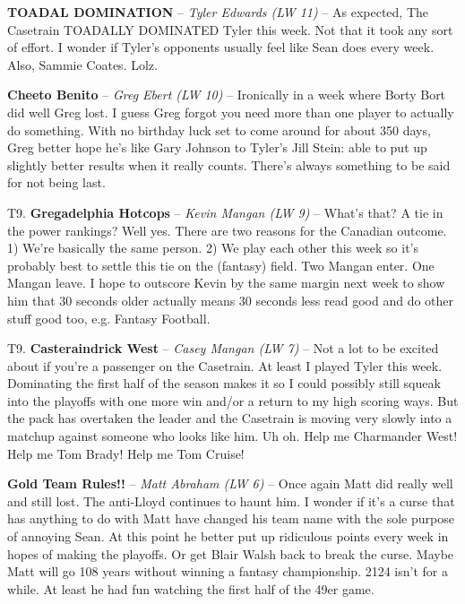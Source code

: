 \documentclass[11pt,letterpaper]{article}
\begin{document}
\newpage
{}
\begin{etaremune}
\setcounter{enumi}{13}
\item \textbf{TOADAL DOMINATION} -- \textit{Tyler Edwards (LW 11)} -- As expected, The Casetrain TOADALLY DOMINATED Tyler this week. Not that it took any sort of effort. I wonder if Tyler's opponents usually feel like Sean does every week. Also, Sammie Coates. Lolz. 
\item \textbf{Cheeto Benito} -- \textit{Greg Ebert (LW 10)} -- Ironically in a week where Borty Bort did well Greg lost. I guess Greg forgot you need more than one player to actually do something. With no birthday luck set to come around for about 350 days, Greg better hope he's like Gary Johnson to Tyler's Jill Stein: able to put up slightly better results when it really counts. There's always something to be said for not being last.
\item[T9.] \textbf{Gregadelphia Hotcops} -- \textit{Kevin Mangan (LW 9)} -- What's that? A tie in the power rankings? Well yes. There are two reasons for the Canadian outcome. 1) We're basically the same person. 2) We play each other this week so it's probably best to settle this tie on the (fantasy) field. Two Mangan enter. One Mangan leave. I hope to outscore Kevin by the same margin next week to show him that 30 seconds older actually means 30 seconds less read good and do other stuff good too, e.g. Fantasy Football. 
\item[T9.] \textbf{Casteraindrick West} -- \textit{Casey Mangan (LW 7)} -- Not a lot to be excited about if you're a passenger on the Casetrain. At least I played Tyler this week. Dominating the first half of the season makes it so I could possibly still squeak into the playoffs with one more win and/or a return to my high scoring ways. But the pack has overtaken the leader and the Casetrain is moving very slowly into a matchup against someone who looks like him. Uh oh. Help me Charmander West! Help me Tom Brady! Help me Tom Cruise!
\setcounter{enumi}{9}
\item \textbf{Gold Team Rules!!} -- \textit{Matt Abraham (LW 6)} -- Once again Matt did really well and still lost. The anti-Lloyd continues to haunt him. I wonder if it's a curse that has anything to do with Matt have changed his team name with the sole purpose of annoying Sean. At this point he better put up ridiculous points every week in hopes of making the playoffs. Or get Blair Walsh back to break the curse. Maybe Matt will go 108 years without winning a fantasy championship. 2124 isn't for a while. At least he had fun watching the first half of the 49er game.

\end{etaremune}
\end{document}
